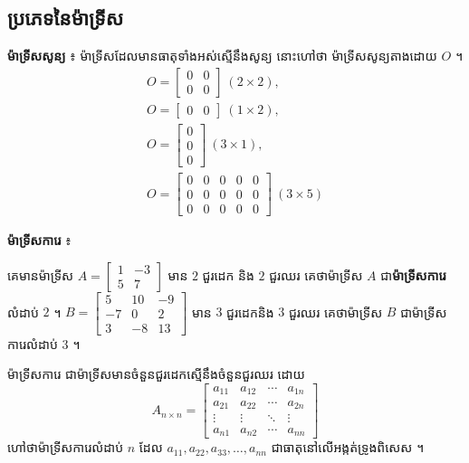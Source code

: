 \subsection{ប្រភេទនៃម៉ាទ្រីស}

\textbf{ម៉ាទ្រីសសូន្យ} ៖ ម៉ាទ្រីសដែលមានធាតុទាំងអស់ស្មើនឹងសូន្យ នោះហៅថា ម៉ាទ្រីសសូន្យតាងដោយ $O$ ។
\[
\begin{gathered}
O = \begin{bmatrix} 0 & 0\\ 0 & 0 \end{bmatrix} \ (2 \times 2),\\
O = \begin{bmatrix} 0 & 0 \end{bmatrix} \ (1 \times 2),\\
O = \begin{bmatrix} 0\\ 0\\ 0 \end{bmatrix} \ (3 \times 1),\\
O = \begin{bmatrix} 0 & 0 & 0 & 0 & 0\\ 0 & 0 & 0 & 0 & 0\\ 0 & 0 & 0 & 0 & 0 \end{bmatrix} \ (3 \times 5)
\end{gathered}
\]

\textbf{ម៉ាទ្រីសការេ} ៖
\begin{example}[ឧទាហរណ៍]
គេមានម៉ាទ្រីស $A = \begin{bmatrix} 1 & -3\\ 5 & 7 \end{bmatrix}$ មាន $2$ ជួរដេក និង $2$ ជួរឈរ គេថាម៉ាទ្រីស $A$ ជា\textbf{ម៉ាទ្រីសការេ}លំដាប់ $2$ ។ $B = \begin{bmatrix} 5 & 10 & -9\\ -7 & 0 & 2\\ 3 & -8 & 13 \end{bmatrix}$ មាន $3$ ជួរដេកនិង $3$ ជួរឈរ គេថាម៉ាទ្រីស $B$ ជាម៉ាទ្រីសការេលំដាប់ $3$ ។
\end{example}

\begin{formulaBox}[ជាទូទៅ]
ម៉ាទ្រីសការេ ជាម៉ាទ្រីសមានចំនួនជួរដេកស្មើនឹងចំនួនជួរឈរ ដោយ
\[ A_{n \times n} = \begin{bmatrix} a_{11} & a_{12} & \cdots & a_{1n}\\ a_{21} & a_{22} & \cdots & a_{2n}\\ \vdots & \vdots & \ddots & \vdots\\ a_{n1} & a_{n2} & \cdots & a_{nn} \end{bmatrix} \]
ហៅថាម៉ាទ្រីសការេលំដាប់ $n$ ដែល $a_{11}, a_{22}, a_{33}, \ldots, a_{nn}$ ជាធាតុនៅលើអង្កត់ទ្រូងពិសេស ។
\end{formulaBox}


